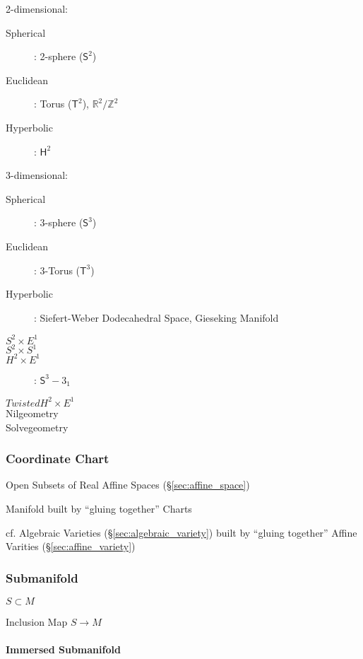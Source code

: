 2-dimensional:

\begin{description}
  \item [Spherical]: 2-sphere ($\mathsf{S}^2$)
  \item [Euclidean]: Torus ($\mathsf{T}^2$),
  $\mathbb{R}^2/\mathbb{Z}^2$
  \item [Hyperbolic]: $\mathsf{H}^2$
\end{description}

3-dimensional:

\begin{description}
  \item [Spherical]: 3-sphere ($\mathsf{S}^3$)
  \item [Euclidean]: 3-Torus ($\mathsf{T}^3$)
  \item [Hyperbolic]: Siefert-Weber Dodecahedral Space, Gieseking
  Manifold
  \item [$S^2 \times E^1$]
  \item [$S^2 \times S^1$]
  \item [$H^2 \times E^1$]: $\mathsf{S}^3 - 3_1$
  \item [$Twisted H^2 \times E^1$]
  \item [Nilgeometry]
  \item [Solvegeometry]
\end{description}



\subsubsection{Coordinate Chart}\label{sec:coordinate_chart}

Open Subsets of Real Affine Spaces (\S\ref{sec:affine_space})

Manifold built by ``gluing together'' Charts

cf. Algebraic Varieties (\S\ref{sec:algebraic_variety}) built by ``gluing
together'' Affine Varities (\S\ref{sec:affine_variety})



\subsubsection{Submanifold}\label{sec:submanifold}

$S \subset M$

Inclusion Map $S \rightarrow M$



\paragraph{Immersed Submanifold}\label{sec:immersed_submanifold}\hfill


